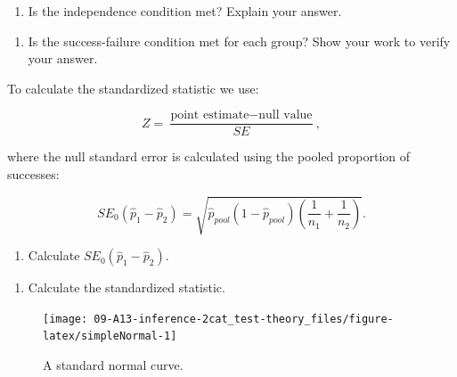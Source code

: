 \documentclass[
]{report}
\providecommand{\tightlist}{%
  \setlength{\itemsep}{0pt}\setlength{\parskip}{0pt}}
\begin{document}
\vspace{.1in}

\begin{enumerate}
\def\labelenumi{\arabic{enumi}.}
\setcounter{enumi}{3}
\tightlist
\item
  Is the independence condition met? Explain your answer.
\end{enumerate}

\vspace{0.4in}

\begin{enumerate}
\def\labelenumi{\arabic{enumi}.}
\setcounter{enumi}{4}
\tightlist
\item
  Is the success-failure condition met for each group? Show your work to verify your answer.
\end{enumerate}

\vspace{0.8in}

To calculate the standardized statistic we use:

\[
Z = \frac{\text{point estimate} - \text{null value}}{SE},
\]

where the null standard error is calculated using the pooled proportion of successes:

\[
SE_0(\hat{p}_1-\hat{p}_2)=\sqrt{\hat{p}_{pool}(1-\hat{p}_{pool})\left(\frac{1}{n_1}+\frac{1}{n_2}\right)}.
\]

\begin{enumerate}
\def\labelenumi{\arabic{enumi}.}
\setcounter{enumi}{5}
\tightlist
\item
  Calculate \(SE_0(\hat{p}_1-\hat{p}_2)\).
\end{enumerate}

\vspace{1in}

\begin{enumerate}
\def\labelenumi{\arabic{enumi}.}
\setcounter{enumi}{6}
\tightlist
\item
  Calculate the standardized statistic.
\end{enumerate}

\vspace{1in}

\newpage

\begin{figure}

{\centering \texttt{[image: 09-A13-inference-2cat\_test-theory\_files/figure-latex/simpleNormal-1]} 

}

\caption{A standard normal curve.}\label{fig:simpleNormal}
\end{figure}
\end{document}
